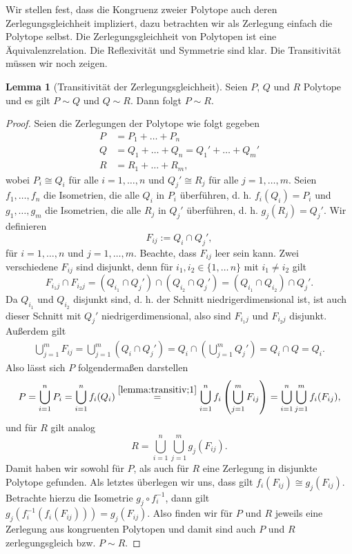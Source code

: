 \documentclass[11pt,titlepage]{article}
\theoremstyle{definition}
\newtheorem{lemma}[theorem]{Lemma}
\theoremstyle{remark}
\begin{document}
	Wir stellen fest, dass die Kongruenz zweier Polytope auch deren 
	Zerlegungsgleichheit impliziert, dazu betrachten wir als Zerlegung einfach 
	die Polytope selbst. Die Zerlegungsgleichheit von Polytopen ist eine 
	Äquivalenzrelation. Die Reflexivität und Symmetrie sind klar. Die 
	Transitivität müssen wir noch zeigen.
	
	\begin{lemma}[Transitivität der Zerlegungsgleichheit] \label{lemma:transitiv}
		Seien $P$, $Q$ und $R$ Polytope und es gilt $P\sim Q$ und $Q\sim R$. Dann folgt $P\sim R$.
	\end{lemma}
	
	\begin{proof}
		Seien die Zerlegungen der Polytope wie folgt gegeben
		\begin{align*}
		P &= P_1+\ldots+P_n \\
		Q &= Q_1+\ldots+Q_n = Q_1'+\ldots+Q_m' \\
		R &= R_1+\ldots+R_m,
		\end{align*}
		wobei $P_i\cong Q_i$ für alle $i=1,\ldots,n$ und $Q_j'\cong R_j$ für alle $j=1,\ldots,m$. 
		Seien $f_1,\ldots,f_n$ die Isometrien, die alle $Q_i$ in $P_i$ überführen, 
		d. h. $f_i(Q_i)=P_i$ und 
		$g_1,\ldots,g_m$ die Isometrien, die alle $R_j$ in $Q_j'$ überführen, d. h. $g_j(R_j)=Q_j'$.
		Wir definieren
		\[ F_{ij}:=Q_i\cap Q_j',\]
		für $i=1,\ldots,n$ und $j=1,\ldots,m$. Beachte, dass $F_{ij}$ leer sein kann. Zwei verschiedene 
		$F_{ij}$ sind disjunkt, denn für $i_1,i_2\in\{1,\ldots\,n\}$ mit $i_1\neq i_2$ gilt 
		\[F_{i_1 j}\cap F_{i_2 j}=(Q_{i_1}\cap Q_j')\cap(Q_{i_2}\cap Q_j')=(Q_{i_1}\cap Q_{i_2})\cap Q_j'.\] 
		Da $Q_{i_1}$ und $Q_{i_2}$ disjunkt sind, d. h. der Schnitt niedrigerdimensional ist, ist 
		auch dieser Schnitt mit $Q_j'$ niedrigerdimensional, also sind $F_{i_1j}$ und $F_{i_2j}$ disjunkt. Außerdem gilt
		\begin{align}
		\bigcup_{j=1}^m F_{ij} = \bigcup_{j=1}^m \left( Q_i \cap Q_j' \right) = 
		Q_i \cap \left( \bigcup_{j=1}^m Q_j' \right)=Q_i \cap Q = Q_i. \label{lemma:transitiv;1}
		\end{align}
		Also lässt sich $P$ folgendermaßen darstellen
		\[ P=\bigcup_{i=1}^n P_i = \bigcup_{i=1}^n f_i(Q_i) \overset{\ref{lemma:transitiv;1}}{=}\bigcup_{i=1}^n f_i 
		\left(\bigcup_{j=1}^m F_{ij} \right) =
		\bigcup_{i=1}^n \bigcup_{j=1}^m f_i(F_{ij}), \]
		und für $R$ gilt analog
		\[ R=\bigcup_{i=1}^n \bigcup_{j=1}^m g_j(F_{ij}). \]
		Damit haben wir sowohl für $P$, als auch für $R$ eine Zerlegung in 
		disjunkte Polytope gefunden. Als letztes überlegen wir uns, 
		dass gilt $f_i(F_{ij})\cong g_j(F_{ij})$. Betrachte hierzu die 
		Isometrie $g_j\circ f_i^{-1}$, dann gilt 
		$g_j(f_i^{-1}(f_i(F_{ij})))=g_j(F_{ij})$. Also finden wir für $P$ und 
		$R$ jeweils eine Zerlegung aus kongruenten Polytopen und damit sind 
		auch $P$ und $R$ zerlegungsgleich bzw. $P\sim R$.
	\end{proof}
	
\end{document}
